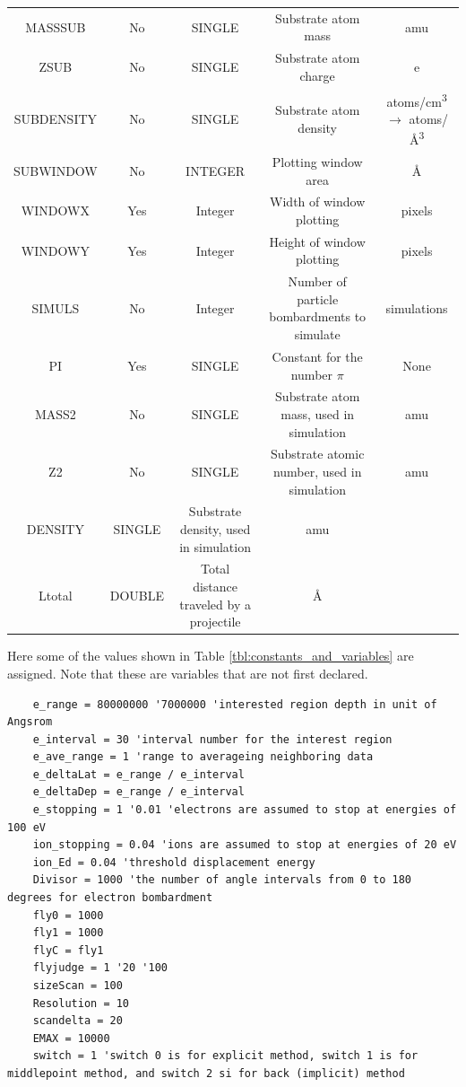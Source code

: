 \documentclass[10pt, reqno]{exam}
\begin{document}
{\begin{longtable}{|c|c|c|c|c|}
        MASSSUB & No & SINGLE & Substrate atom mass & amu \\
        ZSUB & No & SINGLE & Substrate atom charge & e \\
        SUBDENSITY & No & SINGLE & Substrate atom density & \si{atoms/cm^3} $\rightarrow$ \si{atoms/\angstrom^3} \\
        SUBWINDOW & No & INTEGER & Plotting window area & \si{\angstrom} \\
        WINDOWX & Yes & Integer & Width of window plotting & pixels \\
        WINDOWY & Yes & Integer & Height of window plotting & pixels \\
        SIMULS & No & Integer & Number of particle bombardments to simulate & simulations \\
        PI & Yes & SINGLE & Constant for the number $\pi$ & None \\
        \hline
        MASS2 & No & SINGLE & Substrate atom mass, used in simulation & amu \\
        Z2 & No & SINGLE & Substrate atomic number, used in simulation & amu \\
        DENSITY & SINGLE & Substrate density, used in simulation & amu \\
        Ltotal & DOUBLE & Total distance traveled by a projectile & \si{\angstrom} \\
        \hline
    \end{longtable}
}
\pagebreak
Here some of the values shown in Table \ref{tbl:constants_and_variables} are assigned. Note that these are variables that are not first declared.
\begin{verbatim}
    e_range = 80000000 '7000000 'interested region depth in unit of Angsrom
    e_interval = 30 'interval number for the interest region
    e_ave_range = 1 'range to averageing neighboring data
    e_deltaLat = e_range / e_interval
    e_deltaDep = e_range / e_interval
    e_stopping = 1 '0.01 'electrons are assumed to stop at energies of 100 eV
    ion_stopping = 0.04 'ions are assumed to stop at energies of 20 eV
    ion_Ed = 0.04 'threshold displacement energy
    Divisor = 1000 'the number of angle intervals from 0 to 180 degrees for electron bombardment
    fly0 = 1000
    fly1 = 1000
    flyC = fly1
    flyjudge = 1 '20 '100
    sizeScan = 100
    Resolution = 10
    scandelta = 20
    EMAX = 10000
    switch = 1 'switch 0 is for explicit method, switch 1 is for middlepoint method, and switch 2 si for back (implicit) method
\end{verbatim}
\end{document}
